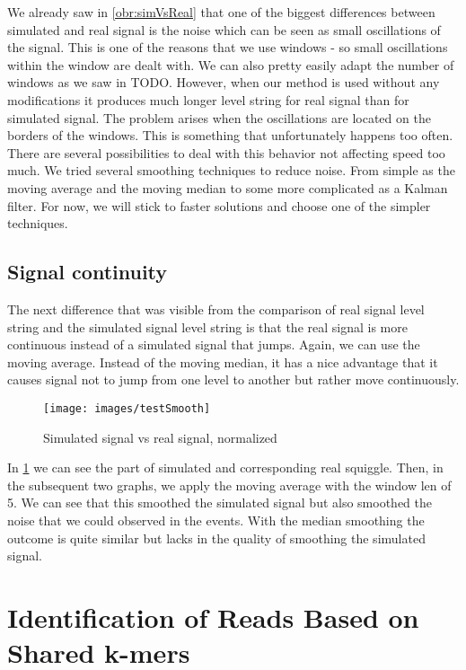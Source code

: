 We already saw in \ref{obr:simVsReal} that one of the biggest differences between simulated and
real signal is the noise which can be seen as small oscillations of the signal. This is
one of the reasons that we use windows - so small oscillations within the window
are dealt with. We can also pretty easily adapt the number of windows as we saw in TODO.
However, when our method is used without any modifications it
produces much longer level string for real signal than for simulated signal.
The problem arises when the oscillations are located on the borders of the windows.
This is something that unfortunately happens too often.
There are several possibilities to deal with this behavior not affecting speed too
much. We tried several smoothing techniques to reduce noise. From simple as the
moving average and the moving median to some more complicated as a Kalman filter.
For now, we will stick to faster solutions and choose one of the simpler techniques.

\subsection{Signal continuity}

The next difference that was visible from the comparison of real signal level string
and the simulated signal level string is that the real signal is more continuous instead
of a simulated signal that jumps. Again, we can use the moving average. Instead of
the moving median, it has a nice advantage that it causes signal not to jump from
one level to another but rather move continuously.

\begin{figure}
\centerline{\texttt{[image: images/testSmooth]}}
\caption[Hehe]{Simulated signal vs real signal, normalized}
\label{obr:testSmooth}
\end{figure}

In \ref{obr:testSmooth} we can see the part of simulated and corresponding real squiggle.
Then, in the subsequent two graphs, we apply the moving average with the window len
of 5. We can see that this smoothed the simulated signal but also smoothed the noise
that we could observed in the events. With the median smoothing the outcome is quite
similar but lacks in the quality of smoothing the simulated signal.

\section{Identification of Reads Based on Shared k-mers}


